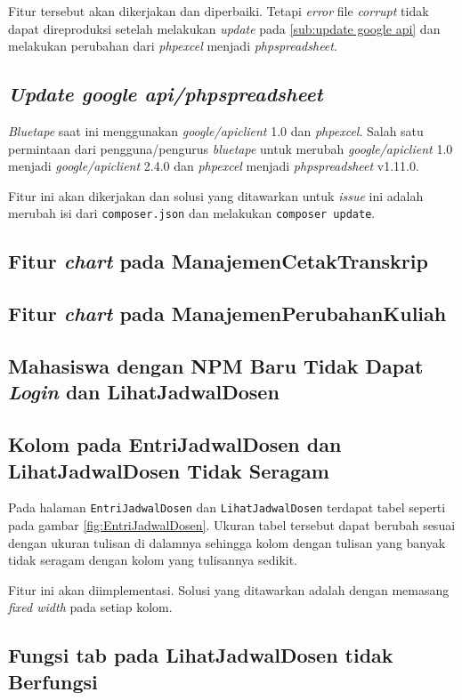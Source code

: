 Fitur tersebut akan dikerjakan dan diperbaiki. Tetapi \textit{error} file \textit{corrupt} tidak dapat direproduksi setelah melakukan \textit{update} pada \ref{sub:update google api} dan melakukan perubahan dari \textit{phpexcel} menjadi \textit{phpspreadsheet}. 

\subsection{\textit{Update google api/phpspreadsheet}}
\textit{Bluetape} saat ini menggunakan \textit{google/apiclient} 1.0 dan \textit{phpexcel}. Salah satu permintaan dari pengguna/pengurus \textit{bluetape} untuk merubah \textit{google/apiclient} 1.0 menjadi \textit{google/apiclient} 2.4.0 dan \textit{phpexcel} menjadi \textit{phpspreadsheet} v1.11.0. 

Fitur ini akan dikerjakan dan solusi yang ditawarkan untuk \textit{issue} ini adalah merubah isi dari \texttt{composer.json} dan melakukan \texttt{composer update}.
\label{sub:update google api}

\subsection{Fitur \textit{chart} pada ManajemenCetakTranskrip}
\subsection{Fitur \textit{chart} pada ManajemenPerubahanKuliah}
\subsection{Mahasiswa dengan NPM Baru Tidak Dapat \textit{Login} dan LihatJadwalDosen}
\subsection{Kolom pada EntriJadwalDosen dan LihatJadwalDosen Tidak Seragam} 
Pada halaman \texttt{EntriJadwalDosen} dan \texttt{LihatJadwalDosen} terdapat tabel seperti pada gambar \ref{fig:EntriJadwalDosen}. Ukuran tabel tersebut dapat berubah sesuai dengan ukuran tulisan di dalamnya sehingga kolom dengan tulisan yang banyak tidak seragam dengan kolom yang tulisannya sedikit.

Fitur ini akan diimplementasi. Solusi yang ditawarkan adalah dengan memasang \textit{fixed width} pada setiap kolom.

\subsection{Fungsi tab pada LihatJadwalDosen tidak Berfungsi}

